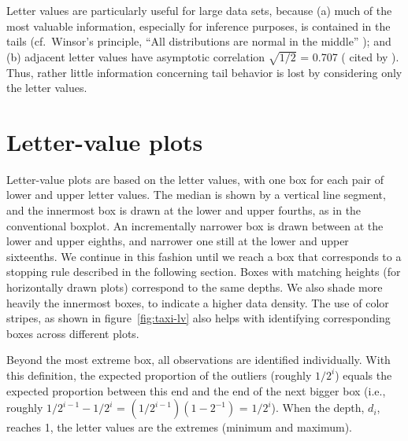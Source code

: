 \documentclass[12pt,oneside]{article}
\begin{document}
Letter values are particularly useful for large data sets, because (a) much of the most valuable information, especially for inference purposes, is contained in the tails (cf.\ Winsor's principle, ``All distributions are normal in the middle'' \citep[pg. 457]{tukey60}); and (b) adjacent letter values have asymptotic correlation $\sqrt{1/2}$ = 0.707 (\citet{mosteller46} cited by \citet[pg. 51--52]{dchlv}). Thus, rather little information concerning tail behavior is lost by considering only the letter values. 

%

\section{Letter-value plots}
\label{sec:lv-boxplots}

Letter-value plots are based on the letter values, with one box for each pair of lower and upper letter values. The median is shown by a vertical line segment, and the innermost box is drawn at the lower and upper fourths, as in the conventional boxplot. An incrementally narrower box is drawn between at the lower and upper eighths, and narrower one still at the lower and upper sixteenths. We continue in this fashion until we reach a box that corresponds to a stopping rule described in the following section. Boxes with matching heights (for horizontally drawn plots) correspond to the same depths. We also shade more heavily the innermost boxes, to indicate a higher data density. The use of color stripes, as shown in figure~\ref{fig:taxi-lv} also helps with identifying corresponding boxes across different plots.

Beyond the most extreme box, all observations are identified individually. With this definition, the expected proportion of the outliers (roughly $1/2^i$) equals the expected proportion between this end and the end of the next bigger box (i.e., roughly $1/2^{i-1} - 1/2^i$ = $(1/2^{i-1})(1 - 2^{-1})$ = $1 / 2^i$). When the depth, $d_i$, reaches 1, the letter values are the extremes (minimum and maximum).
\end{document}
